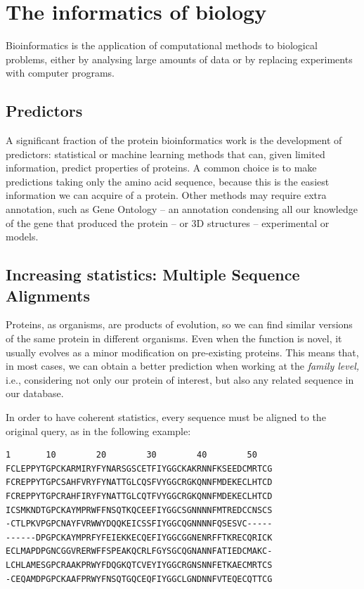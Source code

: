 \chapter{The informatics of biology}
Bioinformatics is the application of computational methods to biological problems,
either by analysing large amounts of data or by replacing experiments with computer programs.

\section{Predictors}
A significant fraction of the protein bioinformatics work is the development of predictors: statistical or machine learning methods that can, given limited information, predict properties of proteins.
A common choice is to make predictions taking only the amino acid sequence, because this is the easiest information we can acquire of a protein.
Other methods may require extra annotation, such as Gene Ontology -- an annotation condensing all our knowledge of the gene that produced the protein -- or 3D structures -- experimental or models.

\section[Multiple Sequence Alignments]{Increasing statistics: Multiple Sequence Alignments}
Proteins, as organisms, are products of evolution, so we can find similar versions of the same protein in different organisms.
Even when the function is novel, it usually evolves as a minor modification on pre-existing proteins.
This means that, in most cases, we can obtain a better prediction when working at the \emph{family level,}
i.e., considering not only our protein of interest, but also any related sequence in our database.

In order to have coherent statistics, every sequence must be aligned to the original query, as in the following example:

\begin{center}
\marginpar{\phantom{a}}
\marginpar{\phantom{a}}
\marginpar{\phantom{a}}
\begin{Verbatim}[fontsize=\small, xleftmargin=1em]
1       10        20        30        40        50   
FCLEPPYTGPCKARMIRYFYNARSGSCETFIYGGCKAKRNNFKSEEDCMRTCG
FCREPPYTGPCSAHFVRYFYNATTGLCQSFVYGGCRGKQNNFMDEKECLHTCD
FCREPPYTGPCRAHFIRYFYNATTGLCQTFVYGGCRGKQNNFMDEKECLHTCD
ICSMKNDTGPCKAYMPRWFFNSQTKQCEEFIYGGCSGNNNNFMTREDCCNSCS
-CTLPKVPGPCNAYFVRWWYDQQKEICSSFIYGGCQGNNNNFQSESVC-----
------DPGPCKAYMPRFYFEIEKKECQEFIYGGCGGNENRFFTKRECQRICK
ECLMAPDPGNCGGVRERWFFSPEAKQCRLFGYSGCQGNANNFATIEDCMAKC-
LCHLAMESGPCRAAKPRWYFDQGKQTCVEYIYGGCRGNSNNFETKAECMRTCS
-CEQAMDPGPCKAAFPRWYFNSQTGQCEQFIYGGCLGNDNNFVTEQECQTTCG
\end{Verbatim}
\end{center}


